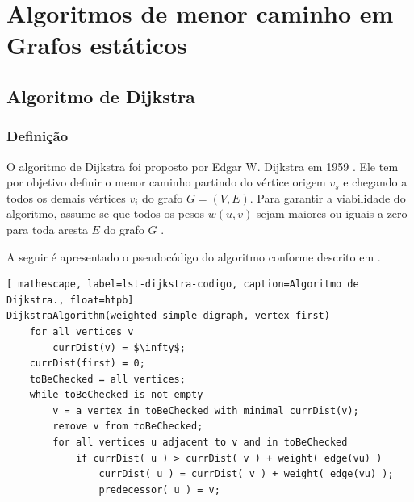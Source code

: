 \chapter{Algoritmos de menor caminho em Grafos estáticos}
\label{sec-algoritmosestaticos}

\section{Algoritmo de Dijkstra}
\label{sec-dijkstra}

\subsection{Definição}
\label{sec-dijkstra-algoritmo}
O algoritmo de Dijkstra foi proposto por Edgar W. Dijkstra em 1959 \cite{dijkstra1959note}. Ele tem por objetivo definir o menor caminho partindo do vértice origem $v_{s}$ e chegando a todos os demais vértices $v_{i}$ do grafo $G = (V,E)$. Para garantir a viabilidade do algoritmo, assume-se que todos os pesos $w( u, v )$ sejam maiores ou iguais a zero para toda aresta $E$ do grafo $G$ \cite{cormen2009introduction}.

A seguir é apresentado o pseudocódigo do algoritmo conforme descrito em .

\begin{lstlisting}[ mathescape, label=lst-dijkstra-codigo, caption=Algoritmo de Dijkstra., float=htpb]
DijkstraAlgorithm(weighted simple digraph, vertex first)
	for all vertices v
		currDist(v) = $\infty$;
	currDist(first) = 0;
	toBeChecked = all vertices;
	while toBeChecked is not empty
		v = a vertex in toBeChecked with minimal currDist(v);
		remove v from toBeChecked;
		for all vertices u adjacent to v and in toBeChecked
			if currDist( u ) > currDist( v ) + weight( edge(vu) )
				currDist( u ) = currDist( v ) + weight( edge(vu) );
				predecessor( u ) = v;
\end{lstlisting}

